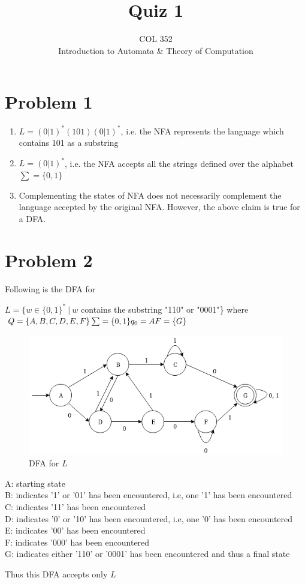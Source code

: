 \documentclass{article}
\title{Quiz 1}
\author{COL 352\\
    Introduction to Automata \& 
    Theory of Computation}
\date{}
\begin{document}
\maketitle

\section*{Problem 1}

\begin{enumerate}
    \item $L = (0|1)^{*}(101)(0|1)^{*}$, i.e. the NFA represents the language which contains 101 as a substring 
    \item $L = (0|1)^{*}$, i.e. the NFA accepts all the strings defined over the alphabet $\sum = \{0, 1 \}$
    \item Complementing the states of NFA does not necessarily complement the language accepted by the original NFA. However, the above claim is true for a DFA. 
\end{enumerate}


\section*{Problem 2}
Following is the DFA for 

$L = \{ w \in  \{0, 1\}^{*} ~|~ w$ contains the substring "110" or "0001"\} where \\
$Q = \{A, B, C, D, E, F\} \\
\sum = \{0 , 1\} \\
q_{0} = A \\
F = \{ G \}$

\begin{figure}[h]
\centering
\includegraphics[scale=0.5]
{Images/q1-2.png}
\caption{DFA for \textit{L}}
\end{figure} 


A: starting state \\
B: indicates '1' or '01' has been encountered, i.e, one '1' has been encountered \\
C: indicates '11' has been encountered \\
D: indicates '0' or '10' has been encountered, i.e, one '0' has been encountered \\
E: indicates '00' has been encountered \\
F: indicates '000' has been encountered \\
G: indicates either '110' or '0001' has been encountered and thus a final state

Thus this DFA accepts only $L$
\end{document}
